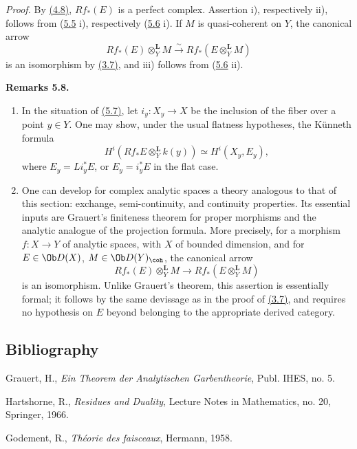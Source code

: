 \emph{Proof.} By \hyperlink{sga6.e03.prop.4-8}{(4.8)}, \(Rf_*(E)\) is a perfect complex. Assertion i), respectively ii), follows from (\hyperlink{sga6.e03.lem.5-5}{5.5} i), respectively (\hyperlink{sga6.e03.cor.5-6}{5.6} i). If \(M\) is quasi-coherent on \(Y\), the canonical arrow
\[
 Rf_*(E)\otimes_Y^{\mathbf L}M
 \xrightarrow{\sim}
 Rf_*(E\otimes_Y^{\mathbf L}M)
\]
is an isomorphism by \hyperlink{sga6.e03.prop.3-7}{(3.7)}, and iii) follows from (\hyperlink{sga6.e03.cor.5-6}{5.6} ii).

\textbf{Remarks 5.8.}
\begin{enumerate}[label=\alph*)]
\item In the situation of \hyperlink{sga6.e03.prop.5-7}{(5.7)}, let \(i_y:X_y\to X\) be the inclusion of the fiber over a point \(y\in Y\). One may show, under the usual flatness hypotheses, the Künneth formula
\[
 H^i(Rf_*E\otimes_Y^{\mathbf L}k(y))
 \simeq H^i(X_y,E_y),
\]
where \(E_y=Li_y^*E\), or \(E_y=i_y^*E\) in the flat case.
\item One can develop for complex analytic spaces a theory analogous to that of this section: exchange, semi-continuity, and continuity properties. Its essential inputs are Grauert's finiteness theorem for proper morphisms and the analytic analogue of the projection formula. More precisely, for a morphism \(f:X\to Y\) of analytic spaces, with \(X\) of bounded dimension, and for \(E\in\Ob D(X)\), \(M\in\Ob D(Y)_{\coh}\), the canonical arrow
\[
 Rf_*(E)\otimes_Y^{\mathbf L}M
 \longrightarrow
 Rf_*(E\otimes_Y^{\mathbf L}M)
\]
is an isomorphism. Unlike Grauert's theorem, this assertion is essentially formal; it follows by the same devissage as in the proof of \hyperlink{sga6.e03.prop.3-7}{(3.7)}, and requires no hypothesis on \(E\) beyond belonging to the appropriate derived category.
\end{enumerate}

\subsection*{Bibliography}
\begin{enumerate}[label={[\arabic*]}]
\item Grauert, H., \emph{Ein Theorem der Analytischen Garbentheorie}, Publ. IHES, no. 5.
\item Hartshorne, R., \emph{Residues and Duality}, Lecture Notes in Mathematics, no. 20, Springer, 1966.
\item Godement, R., \emph{Théorie des faisceaux}, Hermann, 1958.
\end{enumerate}



